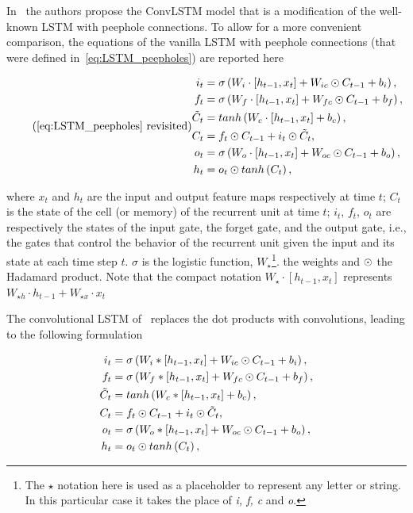 In~\citep{ShiCWYWW15} the authors propose the ConvLSTM model that is a
modification of the well-known LSTM with peephole connections. To allow for a
more convenient comparison, the equations of the vanilla LSTM with peephole
connections (that were defined in~\autoref{eq:LSTM_peepholes}) are reported
here

\begin{equation*}\tag{\ref{eq:LSTM_peepholes} revisited}
\begin{split}
    i_t &= \sigma\left(W_i \cdot \left[h_{t-1}, x_t\right] +
        W_{ic} \hadamard C_{t-1} + b_i \right),\\
    f_t &= \sigma\left(W_f \cdot \left[h_{t-1}, x_t\right] +
        W_{fc} \hadamard C_{t-1} + b_f \right),\\
    \tilde C_t &= tanh \left(W_c \cdot \left[h_{t-1}, x_t\right] + b_c \right),\\
    C_t &= f_t \hadamard C_{t-1} + i_t \hadamard \tilde C_t,\\
    o_t &= \sigma\left(W_o \cdot \left[h_{t-1}, x_t\right] +
        W_{oc} \hadamard C_{t-1} + b_o \right),\\
    h_t &= o_t \hadamard tanh \left(C_t\right),
\end{split}
\end{equation*}

\noindent where $x_t$ and $h_t$ are the input and output feature maps
respectively at time $t$; $C_t$ is the state of the cell (or memory) of the
recurrent unit at time $t$; $i_t$, $f_t$, $o_t$ are respectively the states of
the input gate, the forget gate, and the output gate, i.e., the gates that
control the behavior of the recurrent unit given the input and its state at
each time step $t$. $\sigma$ is the logistic function, $W_{\star}$\footnote{%
    The $\star$ notation here is used as a placeholder to represent any letter
    or string. In this particular case it takes the place of \textit{i, f, c}
    and \textit{o}.}.
the weights and $\odot$ the Hadamard product. Note that the compact
notation $W_\star \cdot [h_{t-1}, x_t]$ represents $W_{\star h} \cdot h_{t-1} +
W_{\star x} \cdot x_t$

The convolutional LSTM of~\citep{ShiCWYWW15} replaces the dot products with
convolutions, leading to the following formulation

\begin{equation}
\begin{split}
    i_t &= \sigma\left(W_i * \left[h_{t-1}, x_t\right] +
        W_{ic} \odot C_{t-1} + b_i \right),\\
    f_t &= \sigma\left(W_f * \left[h_{t-1}, x_t\right] +
        W_{fc} \odot C_{t-1} + b_f \right),\\
    \tilde C_t &= tanh \left(W_c * \left[h_{t-1}, x_t\right] + b_c \right),\\
    C_t &= f_t \odot C_{t-1} + i_t \odot \tilde C_t,\\
    o_t &= \sigma\left(W_o * \left[h_{t-1}, x_t\right] +
        W_{oc} \odot C_{t-1} + b_o \right),\\
    h_t &= o_t \odot tanh \left(C_t\right),
\end{split}
\end{equation}

